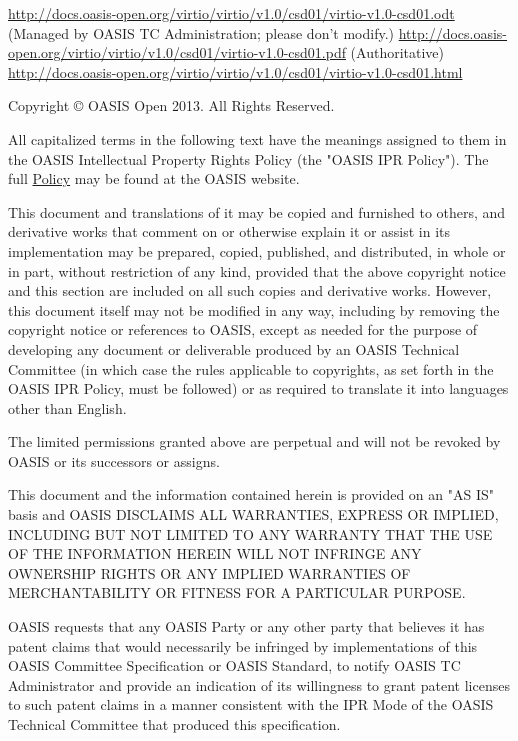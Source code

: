 \begin{titlepage}
\newline
\url{http://docs.oasis-open.org/virtio/virtio/v1.0/csd01/virtio-v1.0-csd01.odt}\newline
(Managed by OASIS TC Administration; please don’t modify.)\newline
\url{http://docs.oasis-open.org/virtio/virtio/v1.0/csd01/virtio-v1.0-csd01.pdf} (Authoritative)\newline
\url{http://docs.oasis-open.org/virtio/virtio/v1.0/csd01/virtio-v1.0-csd01.html}

\vfill\newpage


\vfill\newpage


Copyright © OASIS Open 2013. All Rights Reserved.

All capitalized terms in the following text have the meanings assigned
to them in the OASIS Intellectual Property Rights Policy (the "OASIS
IPR Policy"). The full \href{https://www.oasis-open.org/policies-guidelines/ipr}{Policy} may be found at the OASIS website.

This document and translations of it may be copied and furnished to
others, and derivative works that comment on or otherwise explain it
or assist in its implementation may be prepared, copied, published,
and distributed, in whole or in part, without restriction of any kind,
provided that the above copyright notice and this section are included
on all such copies and derivative works. However, this document itself
may not be modified in any way, including by removing the copyright
notice or references to OASIS, except as needed for the purpose of
developing any document or deliverable produced by an OASIS Technical
Committee (in which case the rules applicable to copyrights, as set
forth in the OASIS IPR Policy, must be followed) or as required to
translate it into languages other than English.

The limited permissions granted above are perpetual and will not be
revoked by OASIS or its successors or assigns.

This document and the information contained herein is provided on an
"AS IS" basis and OASIS DISCLAIMS ALL WARRANTIES, EXPRESS OR IMPLIED,
INCLUDING BUT NOT LIMITED TO ANY WARRANTY THAT THE USE OF THE
INFORMATION HEREIN WILL NOT INFRINGE ANY OWNERSHIP RIGHTS OR ANY
IMPLIED WARRANTIES OF MERCHANTABILITY OR FITNESS FOR A PARTICULAR
PURPOSE.

OASIS requests that any OASIS Party or any other party that believes
it has patent claims that would necessarily be infringed by
implementations of this OASIS Committee Specification or OASIS
Standard, to notify OASIS TC Administrator and provide an indication
of its willingness to grant patent licenses to such patent claims in a
manner consistent with the IPR Mode of the OASIS Technical Committee
that produced this specification.


\end{titlepage}
